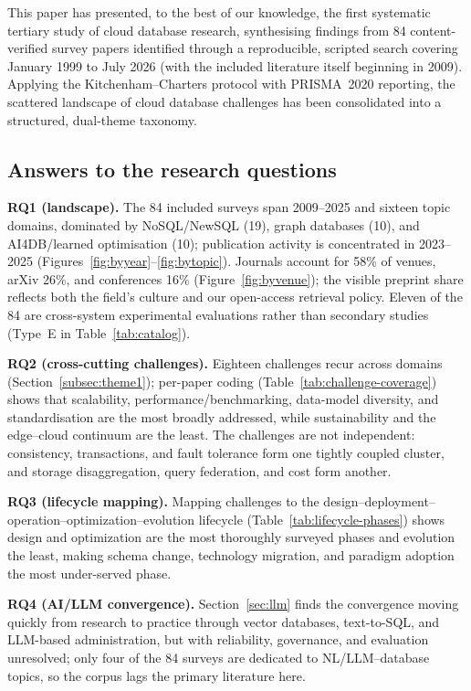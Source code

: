 \documentclass[a4paper,fleqn]{cas-sc}
\begin{document}
This paper has presented, to the best of our knowledge, the first systematic tertiary study of cloud database research, synthesising findings from 84 content-verified survey papers identified through a reproducible, scripted search covering January 1999 to July 2026 (with the included literature itself beginning in 2009). Applying the Kitchenham--Charters protocol with PRISMA~2020 reporting, the scattered landscape of cloud database challenges has been consolidated into a structured, dual-theme taxonomy.

\subsection*{Answers to the research questions}

\noindent\textbf{RQ1 (landscape).} The 84 included surveys span 2009--2025 and sixteen topic domains, dominated by NoSQL/NewSQL (19), graph databases (10), and AI4DB/learned optimisation (10); publication activity is concentrated in 2023--2025 (Figures~\ref{fig:byyear}--\ref{fig:bytopic}). Journals account for 58\% of venues, arXiv 26\%, and conferences 16\% (Figure~\ref{fig:byvenue}); the visible preprint share reflects both the field's culture and our open-access retrieval policy. Eleven of the 84 are cross-system experimental evaluations rather than secondary studies (Type~E in Table~\ref{tab:catalog}).

\noindent\textbf{RQ2 (cross-cutting challenges).} Eighteen challenges recur across domains (Section~\ref{subsec:theme1}); per-paper coding (Table~\ref{tab:challenge-coverage}) shows that scalability, performance/benchmarking, data-model diversity, and standardisation are the most broadly addressed, while sustainability and the edge--cloud continuum are the least. The challenges are not independent: consistency, transactions, and fault tolerance form one tightly coupled cluster, and storage disaggregation, query federation, and cost form another.

\noindent\textbf{RQ3 (lifecycle mapping).} Mapping challenges to the design--deployment--operation--optimization--evolution lifecycle (Table~\ref{tab:lifecycle-phases}) shows design and optimization are the most thoroughly surveyed phases and evolution the least, making schema change, technology migration, and paradigm adoption the most under-served phase.

\noindent\textbf{RQ4 (AI/LLM convergence).} Section~\ref{sec:llm} finds the convergence moving quickly from research to practice through vector databases, text-to-SQL, and LLM-based administration, but with reliability, governance, and evaluation unresolved; only four of the 84 surveys are dedicated to NL/LLM--database topics, so the corpus lags the primary literature here.
\end{document}
